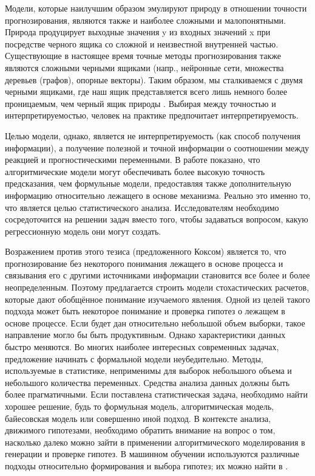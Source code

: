 Модели, которые наилучшим образом эмулируют природу в отношении точности прогнозирования, являются также и наиболее 
сложными и малопонятными. Природа продуцирует выходные значения y из входных значений x при посредстве черного ящика 
со сложной и неизвестной внутренней частью. Существующие в настоящее время точные методы прогнозирования также 
являются сложными черными ящиками (напр., нейронные сети, множества деревьев (графов), опорные векторы). Таким образом, 
мы сталкиваемся с двумя черными ящиками, где наш ящик представляется всего лишь немного более проницаемым, чем черный 
ящик природы \cite{breiman2001statistical}. Выбирая между точностью и интерпретируемостью, человек на практике 
предпочитает интерпретируемость. 

Целью модели, однако, является не интерпретируемость (как способ получения информации), а получение полезной и точной 
информации о соотношении между реакцией и прогностическими переменными. В работе \cite{breiman2001statistical} 
показано, что алгоритмические модели могут обеспечивать более высокую точность предсказания, чем формульные модели, 
предоставляя также дополнительную информацию относительно лежащего в основе механизма. Реально это именно то, что 
является целью статистического анализа. Исследователям необходимо сосредоточится на решении задач вместо того, чтобы 
задаваться вопросом, какую регрессионную модель они могут создать. 

Возражением против этого тезиса (предложенного Коксом) является то, что прогнозирование без некоторого понимания 
лежащего в основе процесса и связывания его с другими источниками информации становится все более и более 
неопределенным. Поэтому предлагается строить модели стохастических расчетов, которые дают обобщённое понимание 
изучаемого явления. Одной из целей такого подхода может быть некоторое понимание и проверка гипотез о лежащем в основе 
процессе. Если будет дан относительно небольшой объем выборки, такое направление могло бы быть продуктивным. 
Однако характеристики данных быстро меняются. Во многих наиболее интересных современных задачах, предложение начинать 
с формальной модели неубедительно. Методы, используемые в статистике, неприменимы для выборок небольшого объема и 
небольшого количества переменных. Средства анализа данных должны быть более прагматичными. Если поставлена 
статистическая задача, необходимо найти хорошее решение, будь то формульная модель, алгоритмическая модель, 
байесовская модель или совершенно иной подход. В контексте анализа, движимого гипотезами, необходимо обратить внимание 
на вопрос о том, насколько далеко можно зайти в применении алгоритмического моделирования в генерации и проверке 
гипотез. В машинном обучении используются различные подходы относительно формирования и выбора гипотез; их можно найти 
в \cite{barber2012bayesian, breiman2001statistical, ivezic2019statistics}.

